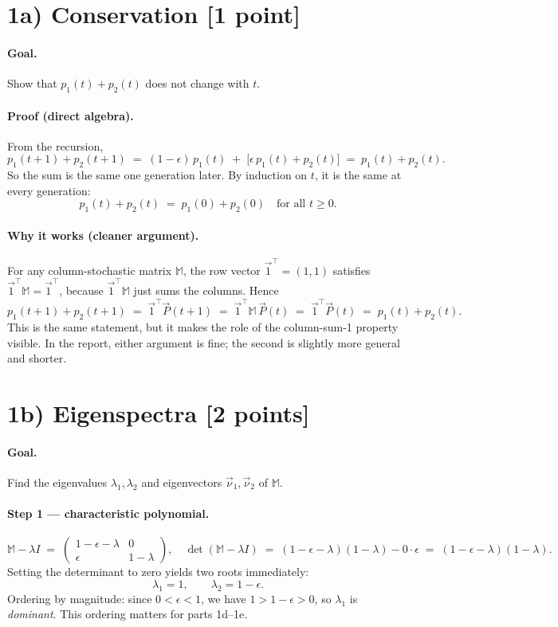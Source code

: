 \documentclass[12pt,a4paper]{article}
\newcommand{\M}{\mathbb{M}}
\newcommand{\vnu}{\vec{\nu}}
\newcommand{\vP}{\vec{P}}
\begin{document}
\section*{1a) Conservation [1 point]}

\paragraph{Goal.} Show that $p_1(t) + p_2(t)$ does not change with $t$.

\paragraph{Proof (direct algebra).} From the recursion,
\[
p_1(t+1) + p_2(t+1) \;=\; (1-\epsilon)\,p_1(t) \;+\; \bigl[\epsilon\, p_1(t) + p_2(t)\bigr] \;=\; p_1(t) + p_2(t).
\]
So the sum is the same one generation later. By induction on $t$, it is the same at every generation:
\[
p_1(t) + p_2(t) \;=\; p_1(0) + p_2(0) \quad \text{for all } t \ge 0.
\]

\paragraph{Why it works (cleaner argument).} For any column-stochastic matrix $\M$, the row vector $\vec{1}^{\top} = (1,1)$ satisfies $\vec{1}^{\top}\M = \vec{1}^{\top}$, because $\vec{1}^{\top}\M$ just sums the columns. Hence
\[
p_1(t+1) + p_2(t+1) \;=\; \vec{1}^{\top}\vP(t+1) \;=\; \vec{1}^{\top}\M\,\vP(t) \;=\; \vec{1}^{\top}\vP(t) \;=\; p_1(t) + p_2(t).
\]
This is the same statement, but it makes the role of the column-sum-1 property visible. In the report, either argument is fine; the second is slightly more general and shorter.

\section*{1b) Eigenspectra [2 points]}

\paragraph{Goal.} Find the eigenvalues $\lambda_1, \lambda_2$ and eigenvectors $\vnu_1, \vnu_2$ of $\M$.

\paragraph{Step 1 --- characteristic polynomial.}
\[
\M - \lambda I \;=\; \begin{pmatrix} 1-\epsilon-\lambda & 0 \\ \epsilon & 1-\lambda \end{pmatrix},
\quad
\det(\M - \lambda I) \;=\; (1-\epsilon-\lambda)(1-\lambda) - 0\cdot\epsilon \;=\; (1-\epsilon-\lambda)(1-\lambda).
\]
Setting the determinant to zero yields two roots immediately:
\[
\boxed{\lambda_1 = 1, \qquad \lambda_2 = 1-\epsilon.}
\]
Ordering by magnitude: since $0 < \epsilon < 1$, we have $1 > 1-\epsilon > 0$, so $\lambda_1$ is \emph{dominant}. This ordering matters for parts 1d--1e.
\end{document}
